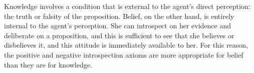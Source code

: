 Knowledge involves a condition that is external to the agent's direct perception: the truth or falsity of the proposition. Belief, on the other hand, is entirely internal to the agent's perception. She can introspect on her evidence and deliberate on a proposition, and this is sufficient to see that she believes or disbelieves it, and this attitude is immediately available to her. For this reason, the positive and negative introspection axioms are more appropriate for belief than they are for knowledge. 







